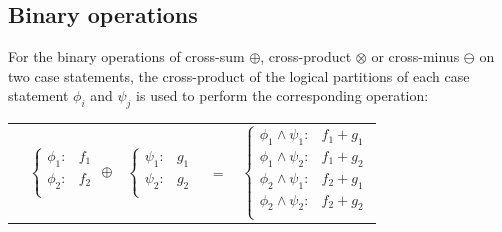 \documentclass[twoside,11pt]{article}
\begin{document}
\subsection{Binary operations}
For the binary operations of cross-sum $\oplus$, cross-product $\otimes$ or cross-minus $\ominus$ on two case statements, the cross-product
of the logical partitions of each case statement  $\phi_i$ and $\psi_j$ is used to perform the
corresponding operation:

{%
\begin{center}
\begin{tabular}{r c c c l}
&
\hspace{-6mm} 
  $\begin{cases}
    \phi_1: & f_1 \\ 
    \phi_2: & f_2 \\ 
  \end{cases}$
$\oplus$
&
\hspace{-4mm}
  $\begin{cases}
    \psi_1: & g_1 \\ 
    \psi_2: & g_2 \\ 
  \end{cases}$
&
\hspace{-2mm} 
$ = $
&
\hspace{-2mm}
  $\begin{cases}
  \phi_1 \wedge \psi_1: & f_1 + g_1 \\ 
  \phi_1 \wedge \psi_2: & f_1 + g_2 \\ 
  \phi_2 \wedge \psi_1: & f_2 + g_1 \\ 
  \phi_2 \wedge \psi_2: & f_2 + g_2 \\ 
  \end{cases}$
\end{tabular}
\vspace{4mm}
\hspace{-2mm}


\end{center}}
\end{document}
